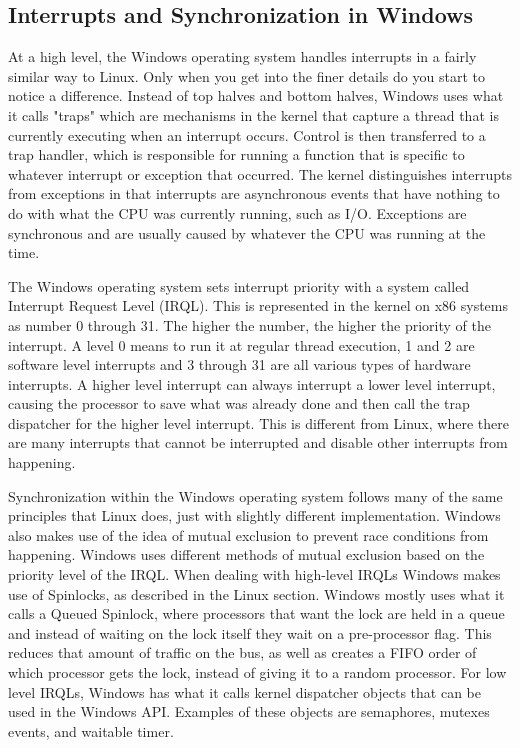 \documentclass[10pt,serif,draftclsnofoot,onecolumn]{IEEEtran}
\begin{document}
	\subsection{Interrupts and Synchronization in Windows}
	\par
			At a high level, the Windows operating system handles interrupts in a fairly similar way to Linux. Only when you get into the finer details do you start to notice a difference. Instead of top halves and bottom halves, Windows uses what it calls "traps" which are mechanisms in the kernel that capture a thread that is currently executing when an interrupt occurs. Control is then transferred to a trap handler, which is responsible for running a function that is specific to whatever interrupt or exception that occurred\cite{22}. The kernel distinguishes interrupts from exceptions in that interrupts are asynchronous events that have nothing to do with what the CPU was currently running, such as I/O. Exceptions are synchronous and are usually caused by whatever the CPU was running at the time.
	\newline
	\par
			The Windows operating system sets interrupt priority with a system called Interrupt Request Level (IRQL). This is represented in the kernel on x86 systems as number 0 through 31. The higher the number, the higher the priority of the interrupt. A level 0 means to run it at regular thread execution, 1 and 2 are software level interrupts and 3 through 31 are all various types of hardware interrupts\cite{22}. A higher level interrupt can always interrupt a lower level interrupt, causing the processor to save what was already done and then call the trap dispatcher for the higher level interrupt. This is different from Linux, where there are many interrupts that cannot be interrupted and disable other interrupts from happening.
	\newline
	\par
			Synchronization within the Windows operating system follows many of the same principles that Linux does, just with slightly different implementation. Windows also makes use of the idea of mutual exclusion to prevent race conditions from happening. Windows uses different methods of mutual exclusion based on the priority level of the IRQL. When dealing with high-level IRQLs Windows makes use of Spinlocks, as described in the Linux section. Windows mostly uses what it calls a Queued Spinlock, where processors that want the lock are held in a queue and instead of waiting on the lock itself they wait on a pre-processor flag\cite{22}. This reduces that amount of traffic on the bus, as well as creates a FIFO order of which processor gets the lock, instead of giving it to a random processor. For low level IRQLs, Windows has what it calls kernel dispatcher objects that can be used in the Windows API. Examples of these objects are semaphores, mutexes events, and waitable timer\cite{22}.		
\end{document}
